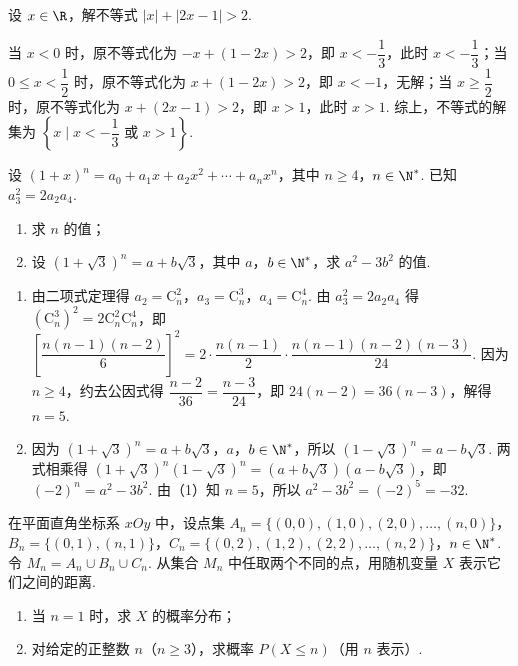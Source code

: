 \reuseproblemnumber
\begin{problem}[C]
设 \(x\in\R\)，解不等式 \(|x|+|2x-1|>2\).

\end{problem}

\begin{solution}
当 \(x<0\) 时，原不等式化为 \(-x+(1-2x)>2\)，即 \(x<-\dfrac13\)，此时 \(x<-\dfrac13\)；当 \(0\le x<\dfrac12\) 时，原不等式化为 \(x+(1-2x)>2\)，即 \(x<-1\)，无解；当 \(x\ge\dfrac12\) 时，原不等式化为 \(x+(2x-1)>2\)，即 \(x>1\)，此时 \(x>1\). 综上，不等式的解集为 \(\left\{x\mid x<-\dfrac13\text{ 或 }x>1\right\}\).
\end{solution}

\begin{problem}
设 \((1+x)^n=a_0+a_1x+a_2x^2+\cdots+a_nx^n\)，其中 \(n\ge 4\)，\(n\in\N^*\). 已知 \(a_3^2=2a_2a_4\).

\begin{enumerate}
\item 求 \(n\) 的值；
\item 设 \((1+\sqrt3)^n=a+b\sqrt3\)，其中 \(a\)，\(b\in\N^*\)，求 \(a^2-3b^2\) 的值.
\end{enumerate}

\end{problem}

\begin{solution}
\begin{enumerate}
\item 由二项式定理得 \(a_2=\mathrm C_n^2\)，\(a_3=\mathrm C_n^3\)，\(a_4=\mathrm C_n^4\). 由 \(a_3^2=2a_2a_4\) 得 \(\left(\mathrm C_n^3\right)^2=2\mathrm C_n^2\mathrm C_n^4\)，即 \(\left[\dfrac{n(n-1)(n-2)}6\right]^2=2\cdot\dfrac{n(n-1)}2\cdot\dfrac{n(n-1)(n-2)(n-3)}{24}\). 因为 \(n\ge4\)，约去公因式得 \(\dfrac{n-2}{36}=\dfrac{n-3}{24}\)，即 \(24(n-2)=36(n-3)\)，解得 \(n=5\).
\item 因为 \((1+\sqrt3)^n=a+b\sqrt3\)，\(a\)，\(b\in\N^*\)，所以 \((1-\sqrt3)^n=a-b\sqrt3\). 两式相乘得 \((1+\sqrt3)^n(1-\sqrt3)^n=(a+b\sqrt3)(a-b\sqrt3)\)，即 \((-2)^n=a^2-3b^2\). 由（1）知 \(n=5\)，所以 \(a^2-3b^2=(-2)^5=-32\).
\end{enumerate}
\end{solution}

\begin{problem}
在平面直角坐标系 \(xOy\) 中，设点集 \(A_n=\{(0,0),(1,0),(2,0),\dots,(n,0)\}\)，\(B_n=\{(0,1),(n,1)\}\)，\(C_n=\{(0,2),(1,2),(2,2),\dots,(n,2)\}\)，\(n\in\N^*\).
令 \(M_n=A_n\cup B_n\cup C_n\). 从集合 \(M_n\) 中任取两个不同的点，用随机变量 \(X\) 表示它们之间的距离.

\begin{enumerate}
\item 当 \(n=1\) 时，求 \(X\) 的概率分布；
\item 对给定的正整数 \(n\)（\(n\ge 3\)），求概率 \(P(X\le n)\)（用 \(n\) 表示）.
\end{enumerate}

\end{problem}

